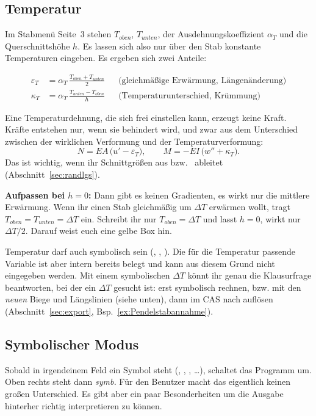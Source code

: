 \subsection{Temperatur}\label{sec:temperatur}

Im Stabmenü Seite~3 stehen $T_{oben}$, $T_{unten}$, der Ausdehnungskoeffizient $\alpha_T$ und die Querschnittshöhe $h$.
Es lassen sich also nur über den Stab konstante Temperaturen eingeben.
Es ergeben sich zwei Anteile:

\begin{align*}
  \varepsilon_T &= \alpha_T \,\frac{T_{oben} + T_{unten}}{2} && \text{(gleichmäßige Erwärmung, Längenänderung)}\\
  \kappa_T &= \alpha_T \,\frac{T_{unten} - T_{oben}}{h} && \text{(Temperaturunterschied, Krümmung)}
\end{align*}

Eine Temperaturdehnung, die sich frei einstellen kann, erzeugt keine Kraft. Kräfte entstehen nur,
wenn sie behindert wird, und zwar aus dem Unterschied zwischen der wirklichen Verformung und der
Temperaturverformung:
\[
  N = EA\,\bigl(u' - \varepsilon_T\bigr), \qquad M = -EI\,\bigl(w'' + \kappa_T\bigr) .
\]
Das ist wichtig, wenn ihr Schnittgrößen aus  bzw.\  ableitet
(Abschnitt~\ref{sec:randlgs}).

\textbf{Aufpassen bei $h = 0$:} Dann gibt es keinen Gradienten, es wirkt nur die mittlere
Erwärmung. Wenn ihr einen Stab gleichmäßig um $\Delta T$ erwärmen wollt, tragt
$T_{oben} = T_{unten} = \Delta T$ ein. Schreibt ihr nur $T_{oben} = \Delta T$ und lasst $h = 0$,
wirkt nur $\Delta T/2$. Darauf weist euch eine gelbe Box hin.

Temperatur darf auch symbolisch sein (, , ). Die für die Temperatur passende Variable 
ist aber intern bereits belegt und kann aus diesem Grund nicht eingegeben werden.
Mit einem symbolischen $\Delta T$ könnt ihr genau die Klausurfrage beantworten, bei der ein $\Delta T$ gesucht ist: erst symbolisch rechnen,
bzw. mit den \emph{neuen} Biege und Längslinien (siehe unten), dann im
CAS nach  auflösen (Abschnitt~\ref{sec:export}, Bsp.~\ref{ex:Pendelstabannahme}).

\subsection{Symbolischer Modus}\label{sec:symbolisch}

Sobald in irgendeinem Feld ein Symbol steht (, , ,  \dots),
schaltet das Programm um. Oben rechts steht dann \emph{symb.} Für den Benutzer macht das eigentlich keinen großen Unterschied.
Es gibt aber ein paar Besonderheiten um die Ausgabe hinterher richtig interpretieren zu können.

